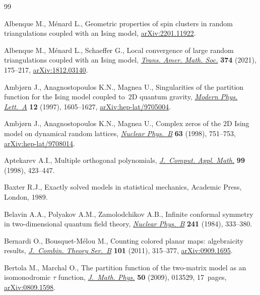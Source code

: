 \documentclass[10pt,a4paper]{amsart}
\numberwithin{equation}{section}
\begin{document}

\begin{thebibliography}{99}
\footnotesize\itemsep=0pt

Albenque M., M\'enard L., Geometric properties of spin clusters in random
 triangulations coupled with an {I}sing model,
 \href{http://arxiv.org/abs/2201.11922}{arXiv:2201.11922}.

Albenque M., M\'enard L., Schaeffer G., Local convergence of large random
 triangulations coupled with an {I}sing model,
 \href{https://doi.org/10.1090/tran/8150}{\textit{Trans. Amer. Math. Soc.}}
 \textbf{374} (2021), 175--217,
 \href{http://arxiv.org/abs/1812.03140}{arXiv:1812.03140}.

Ambj\o{r}n J., Anagnostopoulos K.N., Magnea U., Singularities of the partition
 function for the {I}sing model coupled to~{$2$}{D} quantum gravity,
 \href{https://doi.org/10.1142/S0217732397001643}{\textit{Modern Phys.
 Lett.~A}} \textbf{12} (1997), 1605--1627,
 \href{http://arxiv.org/abs/hep-lat/9705004}{arXiv:hep-lat/9705004}.

Ambj\o{r}n J., Anagnostopoulos K.N., Magnea U., Complex zeros of the {$2$}{D}
 {I}sing model on dynamical random lattices,
 \href{https://doi.org/10.1016/S0920-5632(97)00893-1}{\textit{Nuclear
 Phys.~B}} \textbf{63} (1998), 751--753,
 \href{http://arxiv.org/abs/hep-lat/9708014}{arXiv:hep-lat/9708014}.

Aptekarev A.I., Multiple orthogonal polynomials,
 \href{https://doi.org/10.1016/S0377-0427(98)00175-7}{\textit{J.~Comput. Appl.
 Math.}} \textbf{99} (1998), 423--447.

Baxter R.J., Exactly solved models in statistical mechanics, Academic Press,
 London, 1989.

Belavin A.A., Polyakov A.M., Zamolodchikov A.B., Infinite conformal symmetry in
 two-dimensional quantum field theory,
 \href{https://doi.org/10.1016/0550-3213(84)90052-X}{\textit{Nuclear Phys.~B}}
 \textbf{241} (1984), 333--380.

Bernardi O., Bousquet-M\'elou M., Counting colored planar maps: algebraicity
 results, \href{https://doi.org/10.1016/j.jctb.2011.02.003}{\textit{J.~Combin.
 Theory Ser.~B}} \textbf{101} (2011), 315--377,
 \href{http://arxiv.org/abs/0909.1695}{arXiv:0909.1695}.

Bertola M., Marchal O., The partition function of the two-matrix model as an
 isomonodromic {$\tau$} function,
 \href{https://doi.org/10.1063/1.3054865}{\textit{J.~Math. Phys.}} \textbf{50}
 (2009), 013529, 17~pages,
 \href{http://arxiv.org/abs/0809.1598}{arXiv:0809.1598}.


\end{thebibliography}
\end{document}
